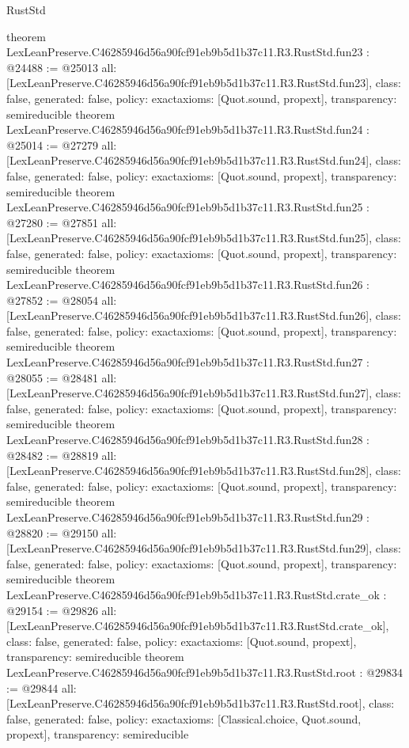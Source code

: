 \begin{lexlean}{RustStd}
\begin{coremodule}
{}
theorem LexLeanPreserve.C46285946d56a90fcf91eb9b5d1b37c11.R3.RustStd.fun23 : @24488 := @25013 {
  all: [LexLeanPreserve.C46285946d56a90fcf91eb9b5d1b37c11.R3.RustStd.fun23],
  class: false,
  generated: false,
  policy: exact{axioms: [Quot.sound, propext]},
  transparency: semireducible
}
theorem LexLeanPreserve.C46285946d56a90fcf91eb9b5d1b37c11.R3.RustStd.fun24 : @25014 := @27279 {
  all: [LexLeanPreserve.C46285946d56a90fcf91eb9b5d1b37c11.R3.RustStd.fun24],
  class: false,
  generated: false,
  policy: exact{axioms: [Quot.sound, propext]},
  transparency: semireducible
}
theorem LexLeanPreserve.C46285946d56a90fcf91eb9b5d1b37c11.R3.RustStd.fun25 : @27280 := @27851 {
  all: [LexLeanPreserve.C46285946d56a90fcf91eb9b5d1b37c11.R3.RustStd.fun25],
  class: false,
  generated: false,
  policy: exact{axioms: [Quot.sound, propext]},
  transparency: semireducible
}
theorem LexLeanPreserve.C46285946d56a90fcf91eb9b5d1b37c11.R3.RustStd.fun26 : @27852 := @28054 {
  all: [LexLeanPreserve.C46285946d56a90fcf91eb9b5d1b37c11.R3.RustStd.fun26],
  class: false,
  generated: false,
  policy: exact{axioms: [Quot.sound, propext]},
  transparency: semireducible
}
theorem LexLeanPreserve.C46285946d56a90fcf91eb9b5d1b37c11.R3.RustStd.fun27 : @28055 := @28481 {
  all: [LexLeanPreserve.C46285946d56a90fcf91eb9b5d1b37c11.R3.RustStd.fun27],
  class: false,
  generated: false,
  policy: exact{axioms: [Quot.sound, propext]},
  transparency: semireducible
}
theorem LexLeanPreserve.C46285946d56a90fcf91eb9b5d1b37c11.R3.RustStd.fun28 : @28482 := @28819 {
  all: [LexLeanPreserve.C46285946d56a90fcf91eb9b5d1b37c11.R3.RustStd.fun28],
  class: false,
  generated: false,
  policy: exact{axioms: [Quot.sound, propext]},
  transparency: semireducible
}
theorem LexLeanPreserve.C46285946d56a90fcf91eb9b5d1b37c11.R3.RustStd.fun29 : @28820 := @29150 {
  all: [LexLeanPreserve.C46285946d56a90fcf91eb9b5d1b37c11.R3.RustStd.fun29],
  class: false,
  generated: false,
  policy: exact{axioms: [Quot.sound, propext]},
  transparency: semireducible
}
theorem LexLeanPreserve.C46285946d56a90fcf91eb9b5d1b37c11.R3.RustStd.crate_ok : @29154 := @29826 {
  all: [LexLeanPreserve.C46285946d56a90fcf91eb9b5d1b37c11.R3.RustStd.crate_ok],
  class: false,
  generated: false,
  policy: exact{axioms: [Quot.sound, propext]},
  transparency: semireducible
}
theorem LexLeanPreserve.C46285946d56a90fcf91eb9b5d1b37c11.R3.RustStd.root : @29834 := @29844 {
  all: [LexLeanPreserve.C46285946d56a90fcf91eb9b5d1b37c11.R3.RustStd.root],
  class: false,
  generated: false,
  policy: exact{axioms: [Classical.choice, Quot.sound, propext]},
  transparency: semireducible
}


\end{coremodule}
\end{lexlean}
